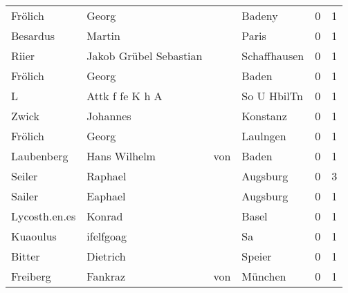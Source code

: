 \begin{tabular}{llllrr}
                  Frölich &                              Georg &             &                                      Badeny &          0 &         1 \\
                 Besardus &                             Martin &             &                                       Paris &          0 &         1 \\
                    Riier &             Jakob Grübel Sebastian &             &                                Schaffhausen &          0 &         1 \\
                  Frölich &                              Georg &             &                                       Baden &          0 &         1 \\
                        L &                    Attk f fe K h A &             &                                 So U HbilTn &          0 &         1 \\
                    Zwick &                           Johannes &             &                                    Konstanz &          0 &         1 \\
                  Frölich &                              Georg &             &                                    Laulngen &          0 &         1 \\
               Laubenberg &                       Hans Wilhelm &         von &                                       Baden &          0 &         1 \\
                   Seiler &                            Raphael &             &                                    Augsburg &          0 &         3 \\
                   Sailer &                            Eaphael &             &                                    Augsburg &          0 &         1 \\
            Lycosth.en.es &                             Konrad &             &                                       Basel &          0 &         1 \\
                 Kuaoulus &                          ifelfgoag &             &                                          Sa &          0 &         1 \\
                   Bitter &                           Dietrich &             &                                      Speier &          0 &         1 \\
                 Freiberg &                            Fankraz &         von &                                     München &          0 &         1 \\

\end{tabular}
